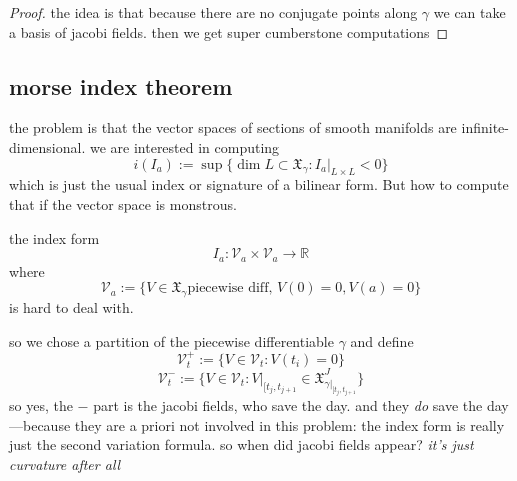 \begin{proof}\leavevmode
the idea is that because there are no conjugate points along \(\gamma\) we can take a basis of jacobi fields. then we get super cumberstone computations
\end{proof}

\subsection{morse index theorem}

the problem is that the vector spaces of sections of smooth manifolds are infinite-dimensional. we are interested in computing
\[i(I_a):=\operatorname{sup}\{\dim L \subset \mathfrak{X}_\gamma:I_a |_{L \times L}<0\}\]
which is just the usual index or signature of a bilinear form. But how to compute that if the vector space is monstrous.

the index form
\[I_a:\mathcal{V}_a \times \mathcal{V}_a \longrightarrow \mathbb{R}\]
where
\[\mathcal{V}_a:=\{V \in \mathfrak{X}_\gamma \text{piecewise diff, }V(0)=0,V(a)=0\}\]
is hard to deal with.

so we chose a partition of the piecewise differentiable \(\gamma\) and define
\[\mathcal{V}_t^+:=\{V \in \mathcal{V}_t: V(t_i)=0\}\]
\[\mathcal{V}_t^-:=\{V \in \mathcal{V}_t:V|_{[t_j,t_{j+1}}\in \mathfrak{X}^J_{\gamma|_{[t_j,t_{j+1}}}\}\]
so yes, the \(-\) part is the jacobi fields, who save the day. and they \textit{do} save the day---because they are a priori not involved in this problem: the index form is really just the second variation formula. so when did jacobi fields appear? \textit{it's just curvature after all}

